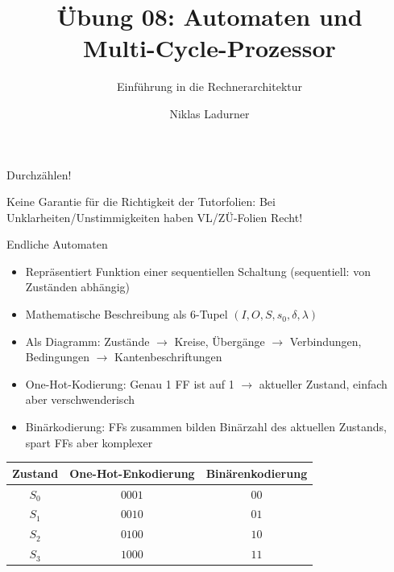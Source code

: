 \documentclass[
  german,            %
  aspectratio=169,    %
]{tumbeamer}
\title{Übung 08: Automaten und \\Multi-Cycle-Prozessor}
\subtitle{Einführung in die Rechnerarchitektur}
\author{Niklas Ladurner}
\institute{\theChairName\\\theDepartmentName\\\theUniversityName}
\date{\DTMdisplaydate{2023}{12}{8}{-1}}
\begin{document}
\maketitle

\begin{frame}[c]{}{}
  \begin{center}
    \LARGE  Durchzählen!
  \end{center}
\end{frame}

\begin{frame}[c]{}{}
  \begin{center}
    \LARGE  Keine Garantie für die Richtigkeit der Tutorfolien: Bei Unklarheiten/Unstimmigkeiten
    haben VL/ZÜ-Folien Recht!
  \end{center}
\end{frame}

\begin{frame}[fragile, c]{Endliche Automaten}{}
  \begin{itemize}
    \item Repräsentiert Funktion einer sequentiellen Schaltung (sequentiell: von Zuständen abhängig)
    \item Mathematische Beschreibung als 6-Tupel $(I, O, S, s_0, \delta, \lambda)$
    \item Als Diagramm: Zustände $\rightarrow$ Kreise, Übergänge $\rightarrow$ Verbindungen, Bedingungen $\rightarrow$ Kantenbeschriftungen
    \item One-Hot-Kodierung: Genau 1 FF ist auf 1 $\rightarrow$ aktueller Zustand, einfach aber verschwenderisch
    \item Binärkodierung: FFs zusammen bilden Binärzahl des aktuellen Zustands, spart FFs aber komplexer
  \end{itemize}
  \begin{table}[]
    \begin{tabular}{c|c|c}
    Zustand & One-Hot-Enkodierung & Binärenkodierung \\ \hline
    $S_0$    & $0001$                & $00$               \\
    $S_1$    & $0010$                & $01$               \\
    $S_2$    & $0100$                & $10$               \\
    $S_3$    & $1000$                & $11$              
    \end{tabular}
    \end{table}
\end{frame}
\end{document}
